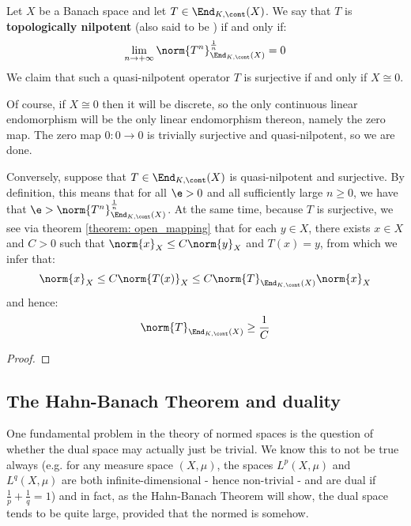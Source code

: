         \begin{example} \label{example: topologically_nilpotent_operators}
            Let $X$ be a Banach space and let $T \in \End_{K, \cont}(X)$. We say that $T$ is \textbf{topologically nilpotent} (also said to be ) if and only if:
                $$\lim_{n \to +\infty} \norm{T^n}_{\End_{K, \cont}(X)}^{\frac1n} = 0$$
            We claim that such a quasi-nilpotent operator $T$ is surjective if and only if $X \cong 0$.

            Of course, if $X \cong 0$ then it will be discrete, so the only continuous linear endomorphism will be the only linear endomorphism thereon, namely the zero map. The zero map $0: 0 \to 0$ is trivially surjective and quasi-nilpotent, so we are done.

            Conversely, suppose that $T \in \End_{K, \cont}(X)$ is quasi-nilpotent and surjective. By definition, this means that for all $\e > 0$ and all sufficiently large $n \geq 0$, we have that $\e > \norm{T^n}_{\End_{K, \cont}(X)}^{\frac1n}$. At the same time, because $T$ is surjective, we see via theorem \ref{theorem: open_mapping} that for each $y \in X$, there exists $x \in X$ and $C > 0$ such that $\norm{x}_X \leq C \norm{y}_X$ and $T(x) = y$, from which we infer that:
                $$\norm{x}_X \leq C \norm{T(x)}_X \leq C \norm{T}_{\End_{K, \cont}(X)} \norm{x}_X$$
            and hence:
                $$\norm{T}_{\End_{K, \cont}(X)} \geq \frac1C$$
            
        \end{example}

        \begin{theorem} \label{theorem: closed_graph}
        \end{theorem}
            \begin{proof}
                
            \end{proof}

    \subsection{The Hahn-Banach Theorem and duality}
        One fundamental problem in the theory of normed spaces is the question of whether the dual space may actually just be trivial. We know this to not be true always (e.g. for any measure space $(X, \mu)$, the spaces $L^p(X, \mu)$ and $L^q(X, \mu)$ are both infinite-dimensional - hence non-trivial - and are dual if $\frac1p + \frac1q = 1$) and in fact, as the Hahn-Banach Theorem will show, the dual space tends to be quite large, provided that the normed is  somehow.

